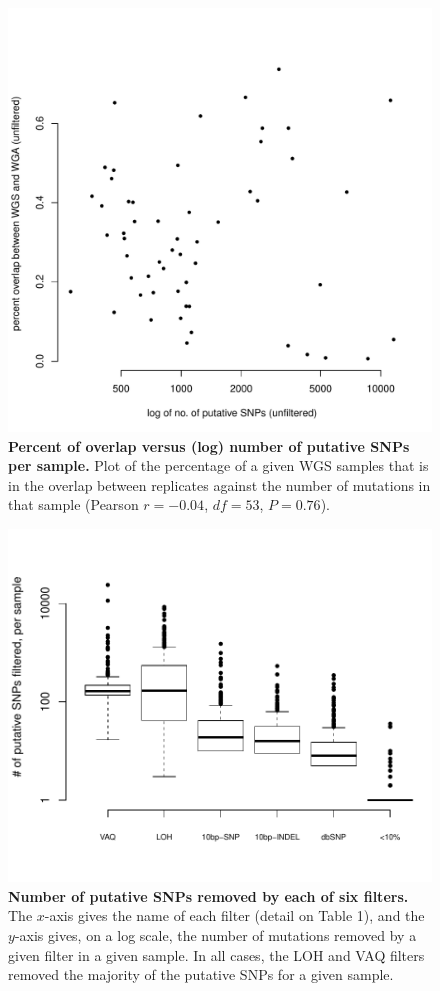 \documentclass[11pt]{article} %
\begin{document}
{%
\begin{figure}
\centerline{
\includegraphics[width=5in]{unfiltered_total_muts_v_percent_overlap.pdf} }
\caption{\textbf{Percent of overlap versus (log) number of putative SNPs per sample.} Plot of the percentage of a given WGS samples that is in the overlap between replicates against the number of mutations in that sample (Pearson $r=-0.04$, $df=53$, $P=0.76$).}
\label{fig:unfiltered_total_muts}
\end{figure}

\begin{figure}
\centerline{
\includegraphics[width=6in]{boxplot_number_filtered.pdf} }
\caption{\textbf{Number of putative SNPs removed by each of six filters.} The $x$-axis gives the name of each filter (detail on Table 1), and the $y$-axis gives, on a log scale, the number of mutations removed by a given filter in a given sample. In all cases, the LOH and VAQ filters removed the majority of the putative SNPs for a given sample.}
\label{fig:boxplot_number_filtered}
\end{figure}

}
\end{document}
